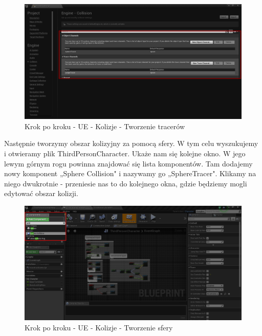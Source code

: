 \documentclass[12pt]{xmgr}
\begin{document}
\begin{figure}[!htb]
    \begin{center}
    \includegraphics[scale=0.35]{Screeny/UeKrokPoKroku/UE-Climb-Collision.png}
    \end{center}
    \caption{Krok po kroku - UE -  Kolizje - Tworzenie tracerów}
\end{figure}
\newpage
Następnie tworzymy obszar kolizyjny za pomocą sfery. W tym celu wyszukujemy i otwieramy plik ThirdPersonCharacter. Ukaże nam się kolejne okno. W jego lewym górnym rogu powinna znajdować się lista komponentów. Tam dodajemy nowy komponent „Sphere Collision" i nazywamy go „SphereTracer". Klikamy na niego dwukrotnie - przeniesie nas to do kolejnego okna, gdzie będziemy mogli edytować obszar kolizji.

\begin{figure}[!htb]
    \begin{center}
    \includegraphics[scale=0.35]{Screeny/UeKrokPoKroku/UE-Climb-Sphere01.png}
    \end{center}
    \caption{Krok po kroku - UE - Kolizje - Tworzenie sfery}
\end{figure}
\newpage
\end{document}
